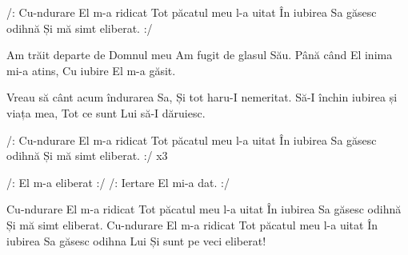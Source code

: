 

\beginchorus
/: Cu-ndurare El m-a ridicat
Tot păcatul meu l-a uitat
În iubirea Sa găsesc odihnă
Și mă simt eliberat. :/
\endchorus

\beginverse
Am trăit departe de Domnul meu
Am fugit de glasul Său.
Până când El inima mi-a atins,
Cu iubire El m-a găsit.
\endverse

\beginverse
Vreau să cânt acum îndurarea Sa,
Și tot haru-I nemeritat.
Să-I închin iubirea și viața mea,
Tot ce sunt Lui să-I dăruiesc.
\endverse

\beginchorus
/: Cu-ndurare El m-a ridicat
Tot păcatul meu l-a uitat
În iubirea Sa găsesc odihnă
Și mă simt eliberat. :/ x3
\endchorus

\beginverse*
/: El m-a eliberat :/
/: Iertare El mi-a dat. :/
\endverse

\beginchorus
Cu-ndurare El m-a ridicat
Tot păcatul meu l-a uitat
În iubirea Sa găsesc odihnă
Și mă simt eliberat.
Cu-ndurare El m-a ridicat
Tot păcatul meu l-a uitat
În iubirea Sa găsesc odihna Lui
Și sunt pe veci eliberat!
\endchorus


\endsong
